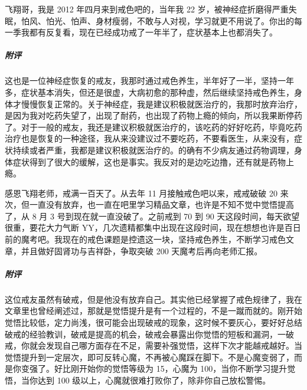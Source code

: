 \begin{case}
    飞翔哥，我是 2012 年四月来到戒色吧的，当年我 22 岁，被神经症折磨得严重失眠，怕风、怕光、怕声、身材瘦弱，不敢与人对视，学习就更不用说了。你出的每一季我都有反复看，现在已经成功戒了一年半了，症状基本上也都消失了。
    \subparagraph{附评} 这也是一位神经症恢复的戒友，我那时通过戒色养生，半年好了一半，坚持一年多，症状基本消失，但还是很虚，大病初愈的那种虚，然后继续坚持戒色养生，身体才慢慢恢复正常的。关于神经症，我是建议积极就医治疗的，我那时放弃治疗，是因为我对吃药失望了，出现了耐药，也出现了药物上瘾的倾向，所以我果断停药了。对于一般的戒友，我还是建议积极就医治疗的，该吃药的好好吃药，毕竟吃药治疗也是恢复的一种途径，我从来没建议过不要吃药，不要看医生，从来没有，症状持续或者严重，我都是建议积极就医治疗的。的确有不少病友通过药物调理，身体症状得到了很大的缓解，这也是事实。我反对的是边吃边撸，还有就是药物上瘾。
\end{case}

\begin{case}
    感恩飞翔老师，戒满一百天了。从去年 11 月接触戒色吧以来，戒戒破破 20 来次，但一直没有放弃，也一直在吧里学习精品文章，也许是不知不觉中觉悟提高了，从 8 月 3 号到现在就一直没破了。之前戒到 70 到 90 天这段时间，每天欲望很重，要花大力气断 YY，几次遗精都集中出现在这段时间，现在想想也许是百日前的魔考吧。我现在的戒色课题是控遗这一块，坚持戒色养生，不断学习戒色文章，并且做好固肾功与吉祥卧，争取突破 200 天魔考后再向老师汇报。
    \subparagraph{附评} 这位戒友虽然有破戒，但是他没有放弃自己。其实他已经掌握了戒色规律了，我在文章里也曾经阐述过，那就是觉悟提升是有一个过程的，不是一蹴而就的。刚开始觉悟比较低，定力尚浅，很可能会出现破戒的现象，这时候不要灰心，要好好总结破戒的经验教训，破戒是提高的机会，破戒会暴露出你觉悟的短板和漏洞，一破戒，你就会发现自己哪方面存在不足，需要补强觉悟，这样下次才能越戒越好。当觉悟提升到一定层次，即可反转心魔，不再被心魔踩在脚下。不是心魔变弱了，而是你变强了。好比刚开始你的觉悟等级为 15，心魔为 100，当你不断学习提升觉悟，当你达到 100 级以上，心魔就很难打败你了，除非你自己放松警惕。
\end{case}

